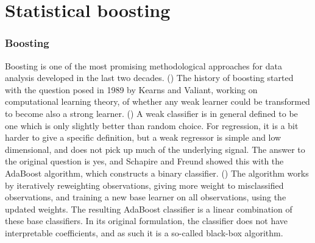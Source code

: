 \chapter{Statistical boosting}
\subsection{Boosting}
Boosting is one of the most promising methodological approaches for data analysis developed in the last two decades. (\cite{mayr14a}) The history of boosting started with the question posed in 1989 by Kearns and Valiant, working on computational learning theory, of whether any weak learner could be transformed to become also a strong learner. (\cite{kearnsvaliant}) A weak classifier is in general defined to be one which is only slightly better than random choice. For regression, it is a bit harder to give a specific definition, but a weak regressor is simple and low dimensional, and does not pick up much of the underlying signal. The answer to the original question is yes, and Schapire and Freund showed this with the AdaBoost algorithm, which constructs a binary classifier. (\cite{adaboost}) The algorithm works by iteratively reweighting observations, giving more weight to misclassified observations, and training a new base learner on all observations, using the updated weights. The resulting AdaBoost classifier is a linear combination of these base classifiers. In its original formulation, the classifier does not have interpretable coefficients, and as such it is a so-called black-box algorithm.

